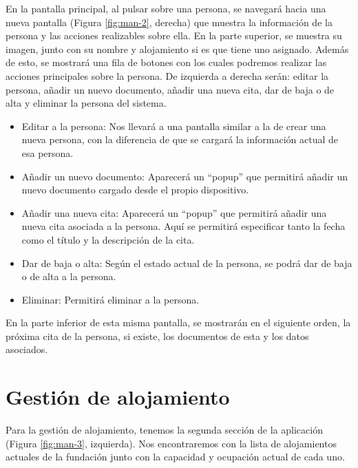 En la pantalla principal, al pulsar sobre una persona, se navegará hacia una nueva pantalla (Figura \ref{fig:man-2}, derecha) que muestra la información de la persona y las acciones realizables sobre ella. En la parte superior, se muestra su imagen, junto con su nombre y alojamiento si es que tiene uno asignado. Además de esto, se mostrará una fila de botones con los cuales podremos realizar las acciones principales sobre la persona. De izquierda a derecha serán: editar la persona, añadir un nuevo documento, añadir una nueva cita, dar de baja o de alta y eliminar la persona del sistema. 

\begin{itemize}
    \item Editar a la persona: Nos llevará a una pantalla similar a la de crear una nueva persona, con la diferencia de que se cargará la información actual de esa persona.
    \item Añadir un nuevo documento: Aparecerá un ``popup'' que permitirá añadir un nuevo documento cargado desde el propio dispositivo.
    \item Añadir una nueva cita: Aparecerá un ``popup'' que permitirá añadir una nueva cita asociada a la persona. Aquí se permitirá especificar tanto la fecha como el título y la descripción de la cita.
    \item Dar de baja o alta: Según el estado actual de la persona, se podrá dar de baja o de alta a la persona.
    \item Eliminar: Permitirá eliminar a la persona.
\end{itemize}

En la parte inferior de esta misma pantalla, se mostrarán en el siguiente orden, la próxima cita de la persona, si existe, los documentos de esta y los datos asociados.

\section{Gestión de alojamiento}

Para la gestión de alojamiento, tenemos la segunda sección de la aplicación (Figura \ref{fig:man-3}, izquierda). Nos encontraremos con la lista de alojamientos actuales de la fundación junto con la capacidad y ocupación actual de cada uno. 

